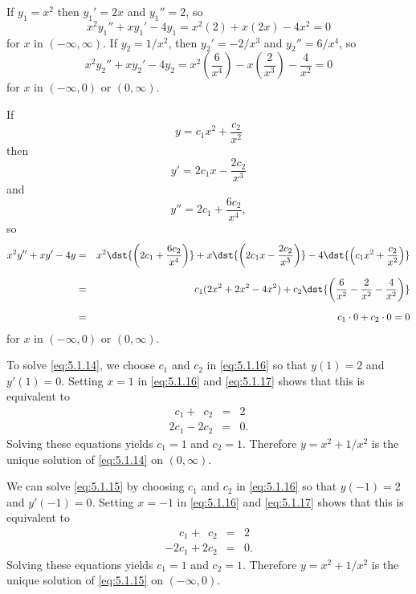 \begin{examplesolution}
 If $y_{1}=x^{2}$ then $y_{1}'=2x$ and $y_{1}''=2$, so
\[
  x^{2}y_{1}''+xy_{1}'-4y_{1}=x^{2}(2)+x(2x)-4x^{2}=0
\]
for $x$ in $(-\infty,\infty)$. If $y_{2}=1/x^{2}$, then $y_{2}'=-2/x^{3}$ and $y_{2}''=6/x^{4}$, so
\[
  x^{2}y_{2}''+xy_{2}'-4y_{2}=x^{2}\left(\frac{6}{x^{4}}\right)-x\left(\frac{2}{x^{3}}\right)-\frac{4}{x^{2}}=0
\]
for $x$ in $(-\infty,0)$ or $(0,\infty)$.

 If
\begin{equation}
  \label{eq:5.1.16}y=c_{1}x^{2}+\frac{c_{2}}{x^{2}}
\end{equation}
then
\begin{equation}
  \label{eq:5.1.17}y'=2c_{1}x-\frac{2c_{2}}{x^{3}}
\end{equation}
and
\[
  y''=2c_{1}+\frac{6c_{2}}{x^{4}},
\]
so
\begin{eqnarray*}
  x^{2}y''+xy'-4y & = & x^{2}\dst{\left(2c_{1}+\frac{6c_{2}}{x^{4}}\right)}+x\dst{\left(2c_{1}x-\frac{2c_{2}}{x^{3}}\right)}-4\dst{\left(c_{1}x^{2}+\frac{c_{2}}{x^{2}}\right)} \\[2\jot]
                  & = & c_{1}(2x^{2}+2x^{2}-4x^{2})+c_{2}\dst{\left(\frac{6}{x^{2}}-\frac{2}{x^{2}}-\frac{4}{x^{2}}\right)}                                                     \\[2\jot]
                  & = & c_{1}\cdot0+c_{2}\cdot0=0
\end{eqnarray*}
for $x$ in $(-\infty,0)$ or $(0,\infty)$.

 To solve \eqref{eq:5.1.14}, we choose $c_{1}$ and $c_{2}$ in \eqref{eq:5.1.16} so
that $y(1)=2$ and $y'(1)=0$. Setting $x=1$ in \eqref{eq:5.1.16} and \eqref{eq:5.1.17} shows that
this is equivalent to
\begin{eqnarray*}
  \phantom{2}c_{1}+\phantom{2}c_{2} & = & 2 \\
  2c_{1}-2c_{2}                     & = & 0.
\end{eqnarray*}
Solving these equations yields $c_{1}=1$ and $c_{2}=1$. Therefore $y=x^{2}+1/x^{2}$ is the unique
solution of \eqref{eq:5.1.14} on $(0,\infty)$.

 We can solve \eqref{eq:5.1.15} by choosing $c_{1}$ and $c_{2}$ in \eqref{eq:5.1.16}
so that $y(-1)=2$ and $y'(-1)=0$. Setting $x=-1$ in \eqref{eq:5.1.16} and \eqref{eq:5.1.17} shows
that this is equivalent to
\begin{eqnarray*}
  \phantom{-2}c_{1}+\phantom{2}c_{2} & = & 2 \\
  -2c_{1}+2c_{2}                     & = & 0.
\end{eqnarray*}
Solving these equations yields $c_{1}=1$ and $c_{2}=1$. Therefore $y=x^{2}+1/x^{2}$ is the unique
solution of \eqref{eq:5.1.15} on $(-\infty,0)$. \bbox


\end{examplesolution}
